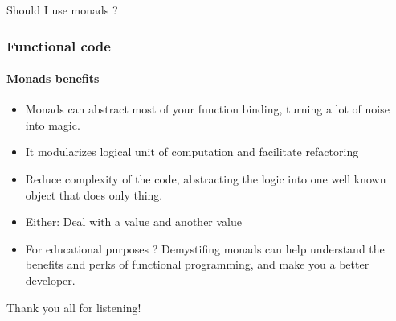 \begin{frame}
  \centering
  \Huge Should I use monads ?
\end{frame}

\begin{frame}
  \frametitle{Functional code}
  \framesubtitle{Monads benefits}

  \begin{itemize}
    \item Monads can abstract most of your function binding, turning a lot of
          noise into magic.
    \item It modularizes logical unit of computation and facilitate refactoring
    \item Reduce complexity of the code, abstracting the logic into one well
          known object that does only thing.
    \item Either: Deal with a value and another value
    \item For educational purposes ? Demystifing monads can help understand
          the benefits and perks of functional programming, and make you a better
          developer.
  \end{itemize}
\end{frame}

\begin{frame}
  \centering
  \Huge Thank you all for listening!
\end{frame}
